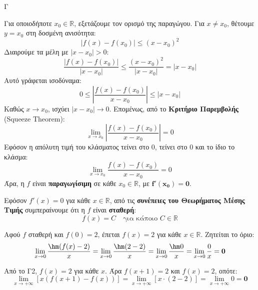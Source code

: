 \begin{thema}{Γ}
\begin{erwthma}
\item Για οποιοδήποτε $x_0 \in \mathbb{R}$, εξετάζουμε τον ορισμό της παραγώγου. Για $x \neq x_0$, θέτουμε $y = x_0$ στη δοσμένη ανισότητα:
\[ |f(x) - f(x_0)| \le (x - x_0)^2 \]
Διαιρούμε τα μέλη με $|x - x_0| > 0$:
\[ \frac{|f(x) - f(x_0)|}{|x - x_0|} \le \frac{(x - x_0)^2}{|x - x_0|} = |x - x_0| \]
Αυτό γράφεται ισοδύναμα:
\[ 0 \le \left| \frac{f(x) - f(x_0)}{x - x_0} \right| \le |x - x_0| \]
Καθώς $x \to x_0$, ισχύει $|x - x_0| \to 0$.
Επομένως, από το \textbf{Κριτήριο Παρεμβολής} (Squeeze Theorem):
\[ \lim_{x \to x_0} \left| \frac{f(x) - f(x_0)}{x - x_0} \right| = 0 \]
Εφόσον η απόλυτη τιμή του κλάσματος τείνει στο 0, τείνει στο 0 και το ίδιο το κλάσμα:
\[ \lim_{x \to x_0} \frac{f(x) - f(x_0)}{x - x_0} = 0 \]
Άρα, η $f$ είναι \textbf{παραγωγίσιμη} σε κάθε $x_0 \in \mathbb{R}$, με $\boldsymbol{f'(x_0) = 0}$.

\item Εφόσον $f'(x) = 0$ για κάθε $x \in \mathbb{R}$, από τις \textbf{συνέπειες του Θεωρήματος Μέσης Τιμής} συμπεραίνουμε ότι η $f$ είναι \textbf{σταθερή}:
\[ f(x) = C \quad \text{για κάποιο } C \in \mathbb{R} \]

\item Αφού $f$ σταθερή και $f(0) = 2$, έπεται $f(x) = 2$ για κάθε $x \in \mathbb{R}$.
Ζητείται το όριο:
\[ \lim_{x \to 0} \frac{\hm(f(x) - 2)}{x} = \lim_{x \to 0} \frac{\hm(2 - 2)}{x} = \lim_{x \to 0} \frac{\hm 0}{x} = \lim_{x \to 0} \frac{0}{x} = \boldsymbol{0} \]

\item Από το Γ2, $f(x) = 2$ για κάθε $x$. Άρα $f(x+1) = 2$ και $f(x) = 2$, οπότε:
\[ \lim_{x \to +\infty} [x(f(x+1) - f(x))] = \lim_{x \to +\infty} [x \cdot (2 - 2)] = \lim_{x \to +\infty} 0 = \boldsymbol{0} \]
\end{erwthma}
\end{thema}

